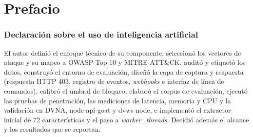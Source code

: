 %
%
\ifdefined\modoensamble
\else
	
	\chapter*{Prefacio}
\fi

\subsection*{Declaración sobre el uso de inteligencia artificial}

El autor definió el enfoque técnico de su componente, seleccionó los vectores de ataque y su
mapeo a OWASP Top 10 y MITRE ATT\&CK, auditó y etiquetó los datos, construyó el entorno de
evaluación, diseñó la capa de captura y respuesta (respuesta HTTP 403, registro de eventos,
\textit{webhooks} e interfaz de línea de comandos), calibró el umbral de bloqueo, elaboró el
corpus de evaluación, ejecutó las pruebas de penetración, las mediciones de latencia, memoria y CPU
y la validación en DVNA, node-api-goat y dvws-node, e implementó el extractor inicial de 72
características y el paso a \textit{worker\_threads}. Decidió además el alcance y los
resultados que se reportan.

